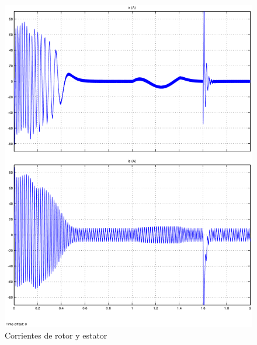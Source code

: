 \documentclass[11pt, a4paper]{article}
\begin{document}
\begin{figure}[H]
\centering
\includegraphics[scale=0.8]{imagenes/corrientes}
\caption{Corrientes de rotor y estator}
\label{corrientes}
\end{figure}
\end{document}
